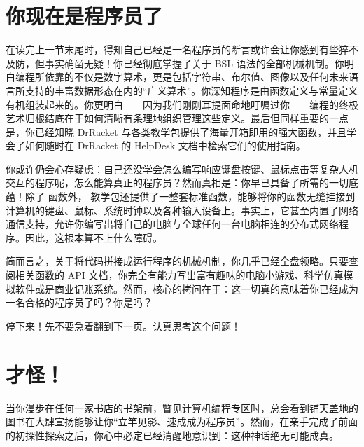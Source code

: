 \section{你现在是程序员了}
\label{sec:prologue:programmer_now}

在读完上一节末尾时，得知自己已经是一名程序员的断言或许会让你感到有些猝不及防，但事实确凿无疑！你已经彻底掌握了关于 BSL 语法的全部机械机制。你明白编程所依靠的不仅是数字算术，更是包括字符串、布尔值、图像以及任何未来语言所支持的丰富数据形态在内的“广义算术”。你深知程序是由函数定义与常量定义有机组装起来的。你更明白——因为我们刚刚耳提面命地叮嘱过你——编程的终极艺术归根结底在于如何清晰有条理地组织管理这些定义。最后但同样重要的一点是，你已经知晓 DrRacket 与各类教学包提供了海量开箱即用的强大函数，并且学会了如何随时在 DrRacket 的 HelpDesk 文档中检索它们的使用指南。

你或许仍会心存疑虑：自己还没学会怎么编写响应键盘按键、鼠标点击等复杂人机交互的程序呢，怎么能算真正的程序员？然而真相是：你早已具备了所需的一切底蕴！除了  函数外， 教学包还提供了一整套标准函数，能够将你的函数无缝挂接到计算机的键盘、鼠标、系统时钟以及各种输入设备上。事实上，它甚至内置了网络通信支持，允许你编写出将自己的电脑与全球任何一台电脑相连的分布式网络程序。因此，这根本算不上什么障碍。

简而言之，关于将代码拼接成运行程序的机械机制，你几乎已经全盘领略。只要查阅相关函数的 API 文档，你完全有能力写出富有趣味的电脑小游戏、科学仿真模拟软件或是商业记账系统。然而，核心的拷问在于：这一切真的意味着你已经成为一名合格的程序员了吗？你是吗？

\begin{notebox}[深度沉思]
停下来！先不要急着翻到下一页。认真思考这个问题！
\end{notebox}


\section{才怪！}
\label{sec:prologue:not}

当你漫步在任何一家书店的书架前，瞥见计算机编程专区时，总会看到铺天盖地的图书在大肆宣扬能够让你“立竿见影、速成成为程序员”。然而，在亲手完成了前面的初探性探索之后，你心中必定已经清醒地意识到：这种神话绝无可能成真。


